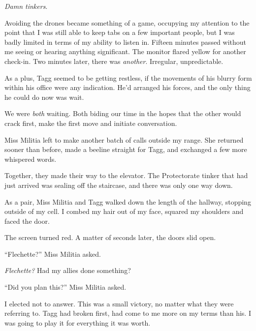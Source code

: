 \emph{Damn tinkers}.



Avoiding the drones became something of a game, occupying my attention to the point that I was still able to keep tabs on a few important people, but I was badly limited in terms of my ability to listen in.  Fifteen minutes passed without me seeing or hearing anything significant.  The monitor flared yellow for another check-in.  Two minutes later, there was \emph{another}.  Irregular, unpredictable.



As a plus, Tagg seemed to be getting restless, if the movements of his blurry form within his office were any indication.  He'd arranged his forces, and the only thing he could do now was wait.



We were \emph{both} waiting.  Both biding our time in the hopes that the other would crack first, make the first move and initiate conversation.



Miss Militia left to make another batch of calls outside my range.  She returned sooner than before, made a beeline straight for Tagg, and exchanged a few more whispered words.



Together, they made their way to the elevator.  The Protectorate tinker that had just arrived was sealing off the staircase, and there was only one way down.



As a pair, Miss Militia and Tagg walked down the length of the hallway, stopping outside of my cell.  I combed my hair out of my face, squared my shoulders and faced the door.



The screen turned red.  A matter of seconds later, the doors slid open.



``Flechette?'' Miss Militia asked.



\emph{Flechette?}  Had my allies done something?



``Did you plan this?'' Miss Militia asked.



I elected not to answer.  This was a small victory, no matter what they were referring to.  Tagg had broken first, had come to me more on my terms than his.  I was going to play it for everything it was worth.



